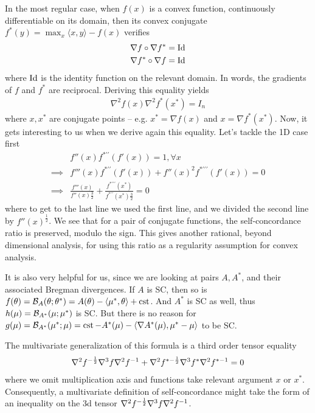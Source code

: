 \documentclass{article}
\newcommand{\logpart}{A}
\newcommand{\conj}{\logpart^*}
\newcommand{\bregman}{\cB_\logpart}
\newcommand{\bregmanconj}{\cB_{\logpart^*}}
\newcommand{\natp}{\theta}
\newcommand{\meanp}{\mu}
\begin{document}
In the most regular case, when $f(x)$ is a convex function, continuously differentiable on its domain, then its convex conjugate $f^*(y) = \max_x \langle x, y \rangle - f(x)$ verifies
\begin{align}
    \nabla f \circ \nabla f^*  &= \mathrm{Id} \\
     \nabla f^* \circ \nabla f &= \mathrm{Id}
\end{align}
where $\mathrm{Id}$ is the identity function on the relevant domain. In words, the gradients of $f$ and $f^*$ are reciprocal.
Deriving this equality yields
\begin{align}
    \nabla^2 f(x) \nabla^2 f^*(x^*) = I_n
\end{align}
where $x,x^*$ are conjugate points -- e.g. $x^*=\nabla f(x)$ and $x = \nabla f^*(x^*)$.
Now, it gets interesting to us when we derive again this equality. Let's tackle the 1D case first
\begin{align}
    &f''(x) f^{* \prime \prime}(f'(x)) = 1, \forall x \\
    \implies
    &f'''(x)f^{* \prime \prime}(f'(x))  + f''(x)^2 f^{* \prime \prime \prime}(f'(x))  = 0 \\
    \implies
    &\frac{f'''(x)}{f''(x){\frac{3}{2}}}  + \frac{f^{* \prime \prime \prime}(x^*)}{f^{* \prime \prime}(x^*){\frac{3}{2}}}  = 0
\end{align}
where to get to the last line we used the first line, and we divided the second line by $f''(x)^{\frac{1}{2}}$. 
We see that for a pair of conjugate functions, the self-concordance ratio is preserved, modulo the sign.
This gives another rational, beyond dimensional analysis, for using this ratio as a regularity assumption for convex analysis. 

It is also very helpful for us, since we are looking at pairs $\logpart, \conj$, and their associated Bregman divergences. 
If $\logpart$ is SC, then so is 
$f(\natp)= \bregman(\natp ; \natp^*) = \logpart(\natp) - \langle \meanp^*, \natp \rangle + \cst$. 
And $\conj$ is SC as well, thus  $h(\meanp) = \bregmanconj ( \meanp ; \meanp^*)$ is SC.
But there is no reason for 
$g(\meanp) = \bregmanconj ( \meanp^* ; \meanp) =  \cst - \conj(\meanp) - \langle \nabla \conj (\meanp), \meanp^* - \meanp \rangle $ to be SC. 

The multivariate generalization of this formula is a third order tensor equality
\begin{align}
    \nabla^2 f^{-\frac{1}{2}} \nabla^3 f \nabla^2 f^{-1} + \nabla^2 f^{* -\frac{1}{2}} \nabla^3 f^* \nabla^2 f^{* -1} = 0
\end{align}
where we omit  multiplication axis and functions take relevant argument $x$ or $x^*$. Consequently, a multivariate definition of self-concordance might take the form of an inequality on the 3d tensor $\nabla^2 f^{-\frac{1}{2}} \nabla^3 f \nabla^2 f^{-1}$.
\end{document}
